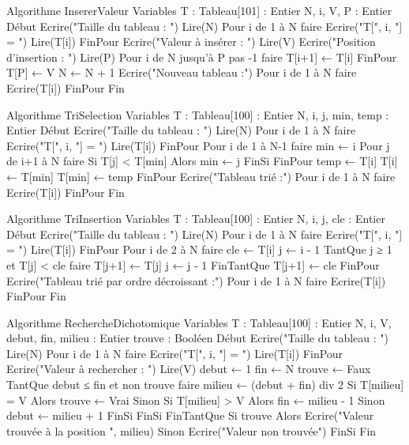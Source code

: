 \begin{algo}
Algorithme InsererValeur
Variables
    T : Tableau[101] : Entier
    N, i, V, P : Entier
Début
    Ecrire("Taille du tableau : ")
    Lire(N)
    Pour i de 1 à N faire
        Ecrire("T[", i, "] = ")
        Lire(T[i])
    FinPour
    Ecrire("Valeur à insérer : ")
    Lire(V)
    Ecrire("Position d'insertion : ")
    Lire(P)
    Pour i de N jusqu'à P pas -1 faire
        T[i+1] ← T[i]
    FinPour
    T[P] ← V
    N ← N + 1
    Ecrire("Nouveau tableau :")
    Pour i de 1 à N faire
        Ecrire(T[i])
    FinPour
Fin
\end{algo}

\begin{algo}
Algorithme TriSelection
Variables
    T : Tableau[100] : Entier
    N, i, j, min, temp : Entier
Début
    Ecrire("Taille du tableau : ")
    Lire(N)
    Pour i de 1 à N faire
        Ecrire("T[", i, "] = ")
        Lire(T[i])
    FinPour
    Pour i de 1 à N-1 faire
        min ← i
        Pour j de i+1 à N faire
            Si T[j] < T[min] Alors
                min ← j
            FinSi
        FinPour
        temp ← T[i]
        T[i] ← T[min]
        T[min] ← temp
    FinPour
    Ecrire("Tableau trié :")
    Pour i de 1 à N faire
        Ecrire(T[i])
    FinPour
Fin
\end{algo}

\begin{algo}
Algorithme TriInsertion
Variables
    T : Tableau[100] : Entier
    N, i, j, cle : Entier
Début
    Ecrire("Taille du tableau : ")
    Lire(N)
    Pour i de 1 à N faire
        Ecrire("T[", i, "] = ")
        Lire(T[i])
    FinPour
    Pour i de 2 à N faire
        cle ← T[i]
        j ← i - 1
        TantQue j ≥ 1 et T[j] < cle faire
            T[j+1] ← T[j]
            j ← j - 1
        FinTantQue
        T[j+1] ← cle
    FinPour
    Ecrire("Tableau trié par ordre décroissant :")
    Pour i de 1 à N faire
        Ecrire(T[i])
    FinPour
Fin
\end{algo}

\begin{algo}
Algorithme RechercheDichotomique
Variables
    T : Tableau[100] : Entier
    N, i, V, debut, fin, milieu : Entier
    trouve : Booléen
Début
    Ecrire("Taille du tableau : ")
    Lire(N)
    Pour i de 1 à N faire
        Ecrire("T[", i, "] = ")
        Lire(T[i])
    FinPour
    Ecrire("Valeur à rechercher : ")
    Lire(V)
    debut ← 1
    fin ← N
    trouve ← Faux
    TantQue debut ≤ fin et non trouve faire
        milieu ← (debut + fin) div 2
        Si T[milieu] = V Alors
            trouve ← Vrai
        Sinon
            Si T[milieu] > V Alors
                fin ← milieu - 1
            Sinon
                debut ← milieu + 1
            FinSi
        FinSi
    FinTantQue
    Si trouve Alors
        Ecrire("Valeur trouvée à la position ", milieu)
    Sinon
        Ecrire("Valeur non trouvée")
    FinSi
Fin
\end{algo}

